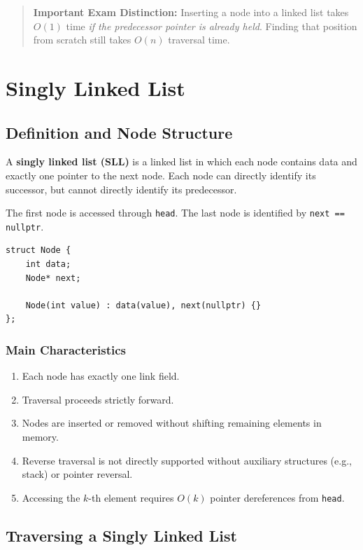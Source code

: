 \begin{quote}
\textbf{Important Exam Distinction:} Inserting a node into a linked list takes $O(1)$ time \emph{if the predecessor pointer is already held}. Finding that position from scratch still takes $O(n)$ traversal time.
\end{quote}

\section{Singly Linked List}

\subsection{Definition and Node Structure}

A \textbf{singly linked list (SLL)} is a linked list in which each node contains data and exactly one pointer to the next node. Each node can directly identify its successor, but cannot directly identify its predecessor.

The first node is accessed through \texttt{head}. The last node is identified by \texttt{next == nullptr}.

\begin{lstlisting}[style=cppstyle]
struct Node {
    int data;
    Node* next;

    Node(int value) : data(value), next(nullptr) {}
};
\end{lstlisting}

\subsubsection{Main Characteristics}
\begin{enumerate}
    \item Each node has exactly one link field.
    \item Traversal proceeds strictly forward.
    \item Nodes are inserted or removed without shifting remaining elements in memory.
    \item Reverse traversal is not directly supported without auxiliary structures (e.g., stack) or pointer reversal.
    \item Accessing the $k$-th element requires $O(k)$ pointer dereferences from \texttt{head}.
\end{enumerate}

\subsection{Traversing a Singly Linked List}

